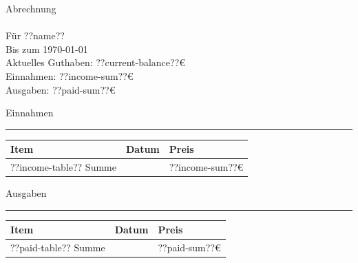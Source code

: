 \documentclass{article}
\begin{document}
\noindent\Huge Abrechnung\\\\
\noindent\Large Für ??name??\\
\noindent\Large Bis zum \today\\

\vspace{0.5cm}
\noindent\huge Aktuelles Guthaben: ??current-balance??€\\

\noindent\Large Einnahmen: ??income-sum??€\\
\noindent\Large Ausgaben: ??paid-sum??€\\

\vspace{0.5cm}
\begin{center}

{\setmainfont{headline-font.ttf}\Huge Einnahmen}

\rule{2.5cm}{0.25pt}

\vspace{0.5cm}

\begin{longtable}{>{\raggedright}p{8cm}>{\raggedright}p{3cm}>{\raggedright}p{2.5cm}}
\toprule
Item & Datum & Preis\tabularnewline\midrule
??income-table??
Summe & & ??income-sum??€\tabularnewline
\bottomrule
\end{longtable}

\vspace{2cm}


{\setmainfont{headline-font.ttf}\Huge Ausgaben}

\rule{2.5cm}{0.25pt}

\vspace{0.5cm}

\begin{longtable}{>{\raggedright}p{8cm}>{\raggedright}p{3cm}>{\raggedright}p{2.5cm}}
\toprule
Item & Datum & Preis\tabularnewline\midrule
??paid-table??
Summe & & ??paid-sum??€\tabularnewline
\bottomrule
\end{longtable}

\end{center}
\end{document}

